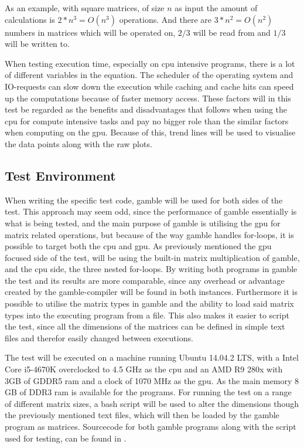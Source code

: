 As an example, with square matrices, of size $n$ as input the amount of calculations is $2*n^3 = O(n^3)$ operations. 
And there are $3*n^2 = O(n^2)$ numbers in matrices which will be operated on, $2/3$ will be read from and $1/3$ will be written to.

When testing execution time, especially on \gls{cpu} intensive programs, there is a lot of different variables in the equation. 
The scheduler of the operating system and IO-requests can slow down the execution while caching and cache hits can speed up the computations because of faster memory access. 
These factors will in this test be regarded as the benefits and disadvantages that follows when using the \gls{cpu} for compute intensive tasks and pay no bigger role than the similar factors when computing on the \gls{gpu}.
Because of this, trend lines will be used to visualise the data points along with the raw plots. 

\subsection{Test Environment} %
\label{sub:test_environment}
When writing the specific test code, \gls{gamble} will be used for both sides of the test.
This approach may seem odd, since the performance of \gls{gamble} essentially is what is being tested, and the main purpose of \gls{gamble} is utilising the \gls{gpu} for matrix related operations, but because of the way \gls{gamble} handles for-loops, it is possible to target both the \gls{cpu} and \gls{gpu}.
As previously mentioned the \gls{gpu} focused side of the test, will be using the built-in matrix multiplication of \gls{gamble}, and the \gls{cpu} side, the three nested for-loops.
By writing both programs in \gls{gamble} the test and its results are more comparable, since any overhead or advantage created by the \gls{gamble}-compiler will be found in both instances.
Furthermore it is possible to utilise the matrix types in \gls{gamble} and the ability to load said matrix types into the executing program from a file.
This also makes it easier to script the test, since all the dimensions of the matrices can be defined in simple text files and therefor easily changed between executions.

The test will be executed on a machine running Ubuntu 14.04.2 LTS, with a Intel Core i5-4670K overclocked to 4.5 GHz as the \gls{cpu} and an AMD R9 280x with 3GB of GDDR5 ram and a clock of 1070 MHz as the \gls{gpu}.
As the main memory 8 GB of DDR3 ram is available for the programs.
For running the test on a range of different matrix sizes, a bash script will be used to alter the dimensions though the previously mentioned text files, which will then be loaded by the \gls{gamble} program as matrices.
Sourcecode for both \gls{gamble} programs along with the script used for testing, can be found in .

